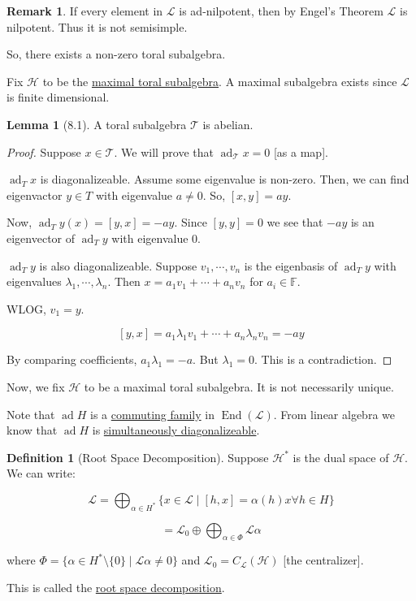\documentclass{article}
\theoremstyle{definition}
\newtheorem*{definition}{Definition}
\newtheorem{lemma}[theorem]{Lemma}
\newtheorem*{remark}{Remark}
\newcommand{\End}{\operatorname{End}}
\newcommand{\ad}{\operatorname{ad}}
\begin{document}
\begin{remark}
    If every element in \(\mathcal{L}\) is ad-nilpotent, then by Engel's Theorem \(\mathcal{L}\) is nilpotent. Thus it is not semisimple. 

    So, there exists a non-zero toral subalgebra.
\end{remark}

Fix \(\mathcal{H}\) to be the \underline{maximal toral subalgebra}. A maximal subalgebra exists since \(\mathcal{L}\) is finite dimensional.

\begin{lemma}
    [8.1] A toral subalgebra \(\mathcal{T}\) is abelian.
\end{lemma}

\begin{proof}
    Suppose \(x\in \mathcal{T}\). We will prove that \(\ad_{\mathcal{T}}x = 0\) [as a map].

    \(\ad_T x\) is diagonalizeable. Assume some eigenvalue is non-zero. Then, we can find eigenvactor \(y\in T\) with eigenvalue \(a \neq 0\). So, \([x,y]=ay\).

    Now, \(\ad_T y (x) = [y,x] = -ay\). Since \([y,y]=0\) we see that \(-ay\) is an eigenvector of \(\ad_T y\) with eigenvalue \(0\). 

    \(\ad_T y\) is also diagonalizeable. Suppose \(v_1, \cdots , v_n\) is the eigenbasis of \(\ad_T y\) with eigenvalues \(\lambda_1, \cdots , \lambda_n\). Then \(x = a_1 v_1 + \cdots + a_n v_n\) for \(a_i \in \mathbb{F} \).

    WLOG, \(v_1 = y\).

    \[
        [y,x] = a_1 \lambda _1 v_1 + \cdots + a_n \lambda_n v_n = -ay
    \]

    By comparing coefficients, \(a_1 \lambda _1 = -a\). But \(\lambda_1 = 0\). This is a contradiction. 

\end{proof}

Now, we fix \(\mathcal{H}\) to be a maximal toral subalgebra. It is not necessarily unique.

Note that \(\ad H\) is a \underline{commuting family} in \(\End(\mathcal{L})\). From linear algebra we know that \(\ad H\) is \underline{simultaneously diagonalizeable}.

\begin{definition}
    [Root Space Decomposition]
    Suppose \(\mathcal{H} ^{\ast} \) is the dual space of \(\mathcal{H}\). We can write:

    \[
        \mathcal{L} = \bigoplus_{\alpha \in H^{\ast}} \{ x \in \mathcal{L} \mid [h,x] = \alpha (h) x \forall h\in H \}
    \]

    \[
        = \mathcal{L}_0 \oplus \bigoplus_{\alpha \in \Phi} \mathcal{L} \alpha 
    \]

    where \(\Phi = \{ \alpha \in H^{\ast} \setminus \{ 0 \}  \mid  \mathcal{L} \alpha \neq 0\} \) and \(\mathcal{L} _0 = C_{\mathcal{L}}(\mathcal{H})\) [the centralizer]. 

    This is called the \underline{root space decomposition}. 

\end{definition}
\end{document}
